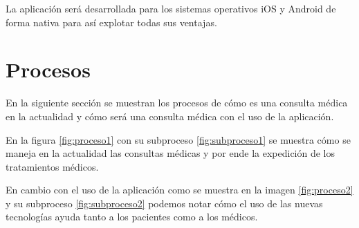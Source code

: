 	\begin{ReqSist}
		{
			La aplicación será desarrollada para los sistemas operativos iOS y Android de forma nativa para así explotar todas sus ventajas.
		}
		{\alta}
		{}{}
	\end{ReqSist}




	
	


\section{Procesos}

En la siguiente sección se muestran los procesos de cómo es una consulta médica en la actualidad y cómo será una consulta médica con el uso de la aplicación.


En la figura \ref{fig:proceso1} con su subproceso \ref{fig:subproceso1} se muestra cómo se maneja en la actualidad las consultas médicas y por ende la expedición de los tratamientos médicos.

En cambio con el uso de la aplicación como se muestra en la imagen \ref{fig:proceso2} y su subproceso \ref{fig:subproceso2} podemos notar cómo el uso de las nuevas tecnologías ayuda tanto a los pacientes como a los médicos.

